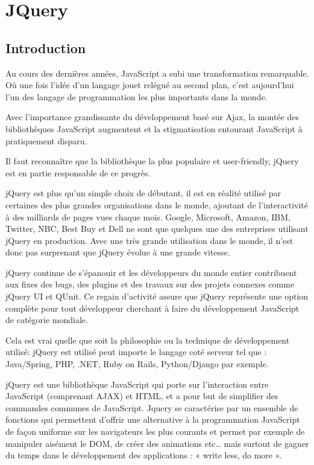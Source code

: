 \section{JQuery}
\label{ch:jQuery}

\subsection{Introduction}

Au cours des dernières années, JavaScript a subi une transformation remarquable. Où une fois l'idée d'un langage jouet relégué au second plan, c'est aujourd'hui l'un des langage de programmation les plus importants dans la monde. 

Avec l'importance grandissante du développement basé sur Ajax, la montée des bibliothèques JavaScript augmentent et la stigmatisation entourant JavaScript à pratiquement disparu.

Il faut reconnaître que la bibliothèque la plus populaire et user-friendly, jQuery est en partie responsable de ce progrès.

jQuery est plus qu'un simple choix de débutant, il est en réalité utilisé par certaines des plus grandes organisations dans le monde, ajoutant de l'interactivité à des milliards de pages vues chaque mois. Google, Microsoft, Amazon, IBM, Twitter, NBC, Best Buy et Dell ne sont que quelques une des entreprises utilisant jQuery en production. Avec une très grande utilisation dans le monde, il n'est donc pas surprenant que jQuery évolue à une grande vitesse. 

jQuery continue de s'épanouir et les développeurs du monde entier contribuent aux fixes des bugs, des plugins et des travaux sur des projets connexes comme jQuery UI et QUnit. Ce regain d'activité assure que jQuery représente une option complète pour tout développeur cherchant à faire du développement JavaScript de catégorie mondiale.

Cela est vrai quelle que soit la philosophie ou la technique de développement utilisé: jQuery est utilisé peut importe le langage coté serveur tel que : Java/Spring, PHP, .NET, Ruby on Rails, Python/Django par exemple.

jQuery est une bibliothèque JavaScript qui porte sur l'interaction entre JavaScript (comprenant AJAX) et HTML, et a pour but de simplifier des commandes communes de JavaScript. Jquery se caractérise par un ensemble de fonctions qui permettent d’offrir une alternative à la programmation JavaScript de façon uniforme sur les navigateurs les plus courants et permet par exemple de manipuler aisément le DOM, de créer des animations etc… mais surtout de gagner du temps dans le développement des applications : « write less, do more ».

